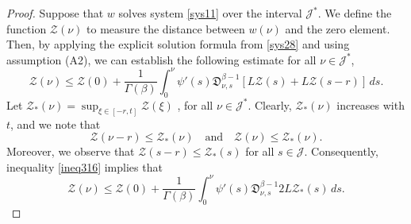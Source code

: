 \documentclass[10pt,a4paper]{amsart}
\numberwithin{equation}{section}
\begin{document}
\begin{proof}
Suppose that \( w \) solves system \eqref{sys11} over the interval
\( \mathcal{J}^{*} \). We define the function \( \mathcal{Z}(\nu ) \) to measure 
the distance between \( w(\nu ) \) and the zero element. 
Then, by applying the explicit solution formula from \eqref{sys28} and using 
assumption (A2), we can establish the following estimate for 
all \( \nu \in \mathcal{J}^{*} \),
\begin{equation}\label{ineq316}
\mathcal{Z}(\nu ) \leq \mathcal{Z}(0)+\frac{1}{\Gamma(\beta)} 
\int_0^{\nu } \psi'(s)\mathfrak{D}_{\nu ,s}^{\beta-1}[ L \mathcal{Z}(s)
+ L \mathcal{Z}(s- r)]\,ds. 
\end{equation}
Let $\mathcal{Z}_{*}(\nu )=\sup _{\xi \in[- r, t]} \mathcal{Z}(\xi)$ , 
for all $\nu \in\mathcal{J}^{*}$. Clearly, \( \mathcal{Z}_{*}(\nu ) \) increases with 
\( t \), and we note that
\begin{equation}\label{ineq317}
\mathcal{Z}(\nu - r) \leq \mathcal{Z}_{*}(\nu ) \quad\text{and}\quad
\mathcal{Z}(\nu ) \leq \mathcal{Z}_{*}(\nu ). 
\end{equation}
Moreover, we observe that \( \mathcal{Z}(s - r) \leq \mathcal{Z}_{*}(s) \) 
for all \( s \in \mathcal{J} \). Consequently, inequality \eqref{ineq316} implies 
that
\begin{equation}\label{ineq318}
\mathcal{Z}(\nu ) \leq \mathcal{Z}(0)+\frac{1}{\Gamma(\beta)} 
\int_0^{\nu } \psi'(s)\mathfrak{D}_{\nu ,s}^{\beta-1}2 L \mathcal{Z}_{*}(s)\,ds .
\end{equation}


\end{proof}
\end{document}
